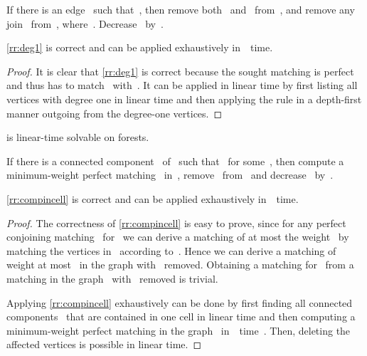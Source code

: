 \begin{rrule}\label{rr:deg1}
  If there is an edge~ such that~, then remove both~ and~ from~, and remove any join~ from~, where~. Decrease~ by~.
\end{rrule}
\begin{observation}\label{obs:deg1runtime}
  \autoref{rr:deg1} is correct and can be applied exhaustively in~~time.
\end{observation}
\begin{proof}
  It is clear that \autoref{rr:deg1} is correct because the sought matching is perfect and thus has to match~ with~. It can be applied in linear time by first listing all vertices with degree one in linear time and then applying the rule in a depth-first manner outgoing from the degree-one vertices.
\end{proof}
\begin{corollary}\label{cor:cbmlintimeonforests}
  \pCBMs{} is linear-time solvable on forests.
\end{corollary}
\begin{rrule}\label{rr:compincell}
  If there is a connected component~ of~ such that~ for some~, then compute a minimum-weight perfect matching~ in~, remove~ from~ and decrease~ by~.
\end{rrule}
\begin{observation}\label{obs:compincellruntime}
  \autoref{rr:compincell} is correct and can be applied exhaustively in~~time.
\end{observation}
\begin{proof}
  The correctness of \autoref{rr:compincell} is easy to prove, since for any perfect conjoining matching~ for~ we can derive a matching of at most the weight~ by matching the vertices in~ according to~. Hence we can derive a matching of weight at most~ in the graph with~ removed. Obtaining a matching for~ from a matching in the graph~ with~ removed is trivial.

  Applying \autoref{rr:compincell} exhaustively can be done by first finding all connected components~ that are contained in one cell in linear time and then computing a minimum-weight perfect matching in the graph~ in~~time~\cite{EK72}. Then, deleting the affected vertices is possible in linear time.
\end{proof}

